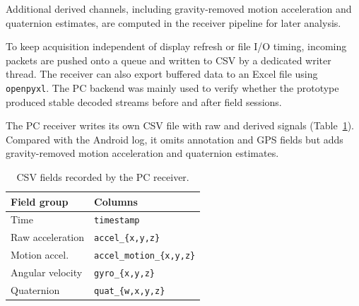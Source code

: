 Additional derived channels, including gravity-removed motion acceleration and quaternion estimates, are computed in the receiver pipeline for later analysis.

To keep acquisition independent of display refresh or file I/O timing, incoming packets are pushed onto a queue and written to CSV by a dedicated writer thread. The receiver can also export buffered data to an Excel file using \texttt{openpyxl}. The PC backend was mainly used to verify whether the prototype produced stable decoded streams before and after field sessions.

The PC receiver writes its own CSV file with raw and derived signals (Table~\ref{tab:pc_csv_format}). Compared with the Android log, it omits annotation and GPS fields but adds gravity-removed motion acceleration and quaternion estimates.

\begin{table}[!htbp]
    \centering
    \footnotesize
    \caption{CSV fields recorded by the PC receiver.}
    \label{tab:pc_csv_format}
    \begin{tabularx}{\linewidth}{lX}
        \toprule
        Field group & Columns \\
        \midrule
        Time              & \texttt{timestamp} \\
        Raw acceleration  & \texttt{accel\_\{x,y,z\}} \\
        Motion accel.     & \texttt{accel\_motion\_\{x,y,z\}} \\
        Angular velocity  & \texttt{gyro\_\{x,y,z\}} \\
        Quaternion        & \texttt{quat\_\{w,x,y,z\}} \\
        \bottomrule
    \end{tabularx}
\end{table}

\FloatBarrier
